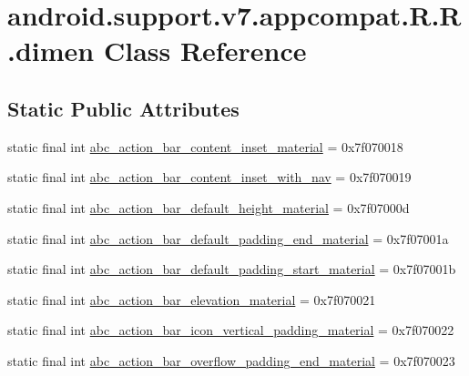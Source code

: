 \hypertarget{classandroid_1_1support_1_1v7_1_1appcompat_1_1_r_1_1dimen}{
\section{android.support.v7.appcompat.R.R.dimen Class Reference}
\label{classandroid_1_1support_1_1v7_1_1appcompat_1_1_r_1_1dimen}
}
\subsection*{Static Public Attributes}
\begin{CompactItemize}
\item 
static final int \hyperlink{classandroid_1_1support_1_1v7_1_1appcompat_1_1_r_1_1dimen_dda05fe6a45b1ad91d5ab54715387235}{abc\_\-action\_\-bar\_\-content\_\-inset\_\-material} = 0x7f070018
\item 
static final int \hyperlink{classandroid_1_1support_1_1v7_1_1appcompat_1_1_r_1_1dimen_7efb17418593a8159810736167153d71}{abc\_\-action\_\-bar\_\-content\_\-inset\_\-with\_\-nav} = 0x7f070019
\item 
static final int \hyperlink{classandroid_1_1support_1_1v7_1_1appcompat_1_1_r_1_1dimen_6c563a17940932308c0bc874c655febb}{abc\_\-action\_\-bar\_\-default\_\-height\_\-material} = 0x7f07000d
\item 
static final int \hyperlink{classandroid_1_1support_1_1v7_1_1appcompat_1_1_r_1_1dimen_e579a33050674da0f4650af95fcf8485}{abc\_\-action\_\-bar\_\-default\_\-padding\_\-end\_\-material} = 0x7f07001a
\item 
static final int \hyperlink{classandroid_1_1support_1_1v7_1_1appcompat_1_1_r_1_1dimen_36fd9103257450c967031461d404c0ea}{abc\_\-action\_\-bar\_\-default\_\-padding\_\-start\_\-material} = 0x7f07001b
\item 
static final int \hyperlink{classandroid_1_1support_1_1v7_1_1appcompat_1_1_r_1_1dimen_bb166bc8858f249ecfdb06db6d59092a}{abc\_\-action\_\-bar\_\-elevation\_\-material} = 0x7f070021
\item 
static final int \hyperlink{classandroid_1_1support_1_1v7_1_1appcompat_1_1_r_1_1dimen_84ce3251a15d28d84717bef6d281b12c}{abc\_\-action\_\-bar\_\-icon\_\-vertical\_\-padding\_\-material} = 0x7f070022
\item 
static final int \hyperlink{classandroid_1_1support_1_1v7_1_1appcompat_1_1_r_1_1dimen_747e63a092640a73d545336063afad78}{abc\_\-action\_\-bar\_\-overflow\_\-padding\_\-end\_\-material} = 0x7f070023

\end{CompactItemize}
